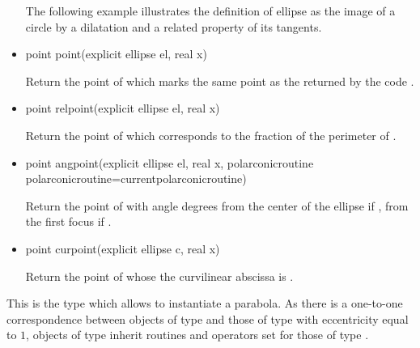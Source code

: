 \documentclass[pdftex]{article}
\begin{document}
\begin{itemize}
  The following example illustrates the definition of ellipse as
  the image of a circle by a dilatation and a related property of
  its tangents.
\item {}
  \begin{Vcolor}
    point point(explicit ellipse el, real x)
  \end{Vcolor}
  Return the point of  which marks the same point as the
   returned by the code .
\item {}
  \begin{Vcolor}
    point relpoint(explicit ellipse el, real x)
  \end{Vcolor}
  Return the point of  which corresponds to the fraction 
  of the perimeter of .
\item {}
  \begin{Vcolor}
    point angpoint(explicit ellipse el, real x,
    polarconicroutine polarconicroutine=currentpolarconicroutine)
  \end{Vcolor}
  Return the point of  with angle  degrees
  from the center of the ellipse\linebreak
  if , from the first focus if
  .
\item {}
  \begin{Vcolor}
    point curpoint(explicit ellipse c, real x)
  \end{Vcolor}
  Return the point of  whose the curvilinear abscissa is .
\end{itemize}

This is the type  which allows to instantiate a
parabola.
As there is a one-to-one correspondence between objects of type
 and those of type  with eccentricity equal
to $1$, objects of type  inherit routines and operators
set for those of type .
\end{document}
